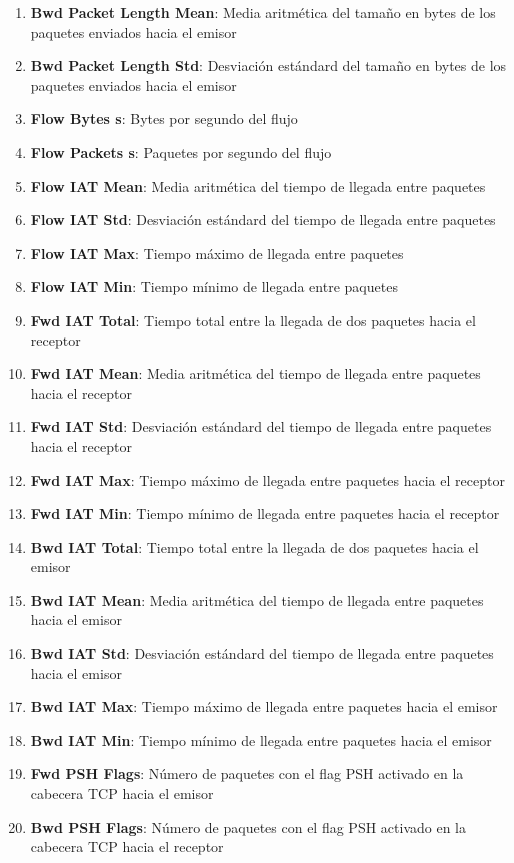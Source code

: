 \begin{enumerate}
    \item \textbf{Bwd Packet Length Mean}: Media aritmética del tamaño en bytes de los paquetes enviados hacia el emisor
    \item \textbf{Bwd Packet Length Std}: Desviación estándard del tamaño en bytes de los paquetes enviados hacia el emisor
    \item \textbf{Flow Bytes s}: Bytes por segundo del flujo
    \item \textbf{Flow Packets s}: Paquetes por segundo del flujo
    \item \textbf{Flow IAT Mean}: Media aritmética del tiempo de llegada entre paquetes
    \item \textbf{Flow IAT Std}: Desviación estándard del tiempo de llegada entre paquetes
    \item \textbf{Flow IAT Max}: Tiempo máximo de llegada entre paquetes
    \item \textbf{Flow IAT Min}: Tiempo mínimo de llegada entre paquetes
    \item \textbf{Fwd IAT Total}: Tiempo total entre la llegada de dos paquetes hacia el receptor
    \item \textbf{Fwd IAT Mean}: Media aritmética del tiempo de llegada entre paquetes hacia el receptor
    \item \textbf{Fwd IAT Std}: Desviación estándard del tiempo de llegada entre paquetes hacia el receptor
    \item \textbf{Fwd IAT Max}: Tiempo máximo de llegada entre paquetes hacia el receptor
    \item \textbf{Fwd IAT Min}: Tiempo mínimo de llegada entre paquetes hacia el receptor
    \item \textbf{Bwd IAT Total}: Tiempo total entre la llegada de dos paquetes hacia el emisor
    \item \textbf{Bwd IAT Mean}: Media aritmética del tiempo de llegada entre paquetes hacia el emisor
    \item \textbf{Bwd IAT Std}: Desviación estándard del tiempo de llegada entre paquetes hacia el emisor
    \item \textbf{Bwd IAT Max}: Tiempo máximo de llegada entre paquetes hacia el emisor
    \item \textbf{Bwd IAT Min}: Tiempo mínimo de llegada entre paquetes hacia el emisor
    \item \textbf{Fwd PSH Flags}: Número de paquetes con el flag PSH activado en la cabecera TCP hacia el emisor
    \item \textbf{Bwd PSH Flags}: Número de paquetes con el flag PSH activado en la cabecera TCP hacia el receptor

\end{enumerate}
